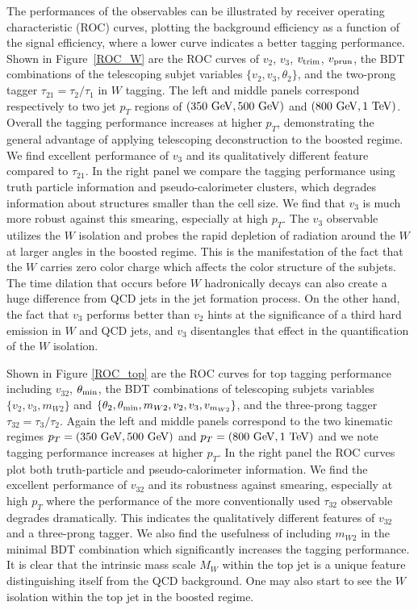 \documentclass[aps,prl,floatfix,preprintnumbers,twocolumn,groupedaddress,nofootinbib]{revtex4-1}
\begin{document}
The performances of the observables can be illustrated by receiver operating characteristic (ROC) curves, plotting the background efficiency as a function of the signal efficiency, where a lower curve indicates a better tagging performance. Shown in Figure~\ref{ROC_W} are the ROC curves of $v_2$, $v_3$, $v_{\rm trim}$, $v_{\rm prun}$, the BDT combinations of the telescoping subjet variables $\{v_2, v_3, \theta_2\}$, and the two-prong tagger $\tau_{21}=\tau_{2}/\tau_{1}$ in $W$ tagging. The left and middle panels correspond respectively to two jet $p_T$ regions of $(350~{\rm GeV}, 500~{\rm GeV})$ and $(800~{\rm GeV}, 1~{\rm TeV})$. Overall the tagging performance increases at higher $p_T$, demonstrating the general advantage of applying telescoping deconstruction to the boosted regime. We find excellent performance of $v_3$ and its qualitatively different feature compared to $\tau_{21}$. In the right panel we compare the tagging performance using truth particle information and pseudo-calorimeter clusters, which degrades information about structures smaller than the cell size. We find that $v_3$ is much more robust against this smearing, especially at high $p_T$. The $v_3$ observable utilizes the $W$ isolation and probes the rapid depletion of radiation around the $W$ at larger angles in the boosted regime. This is the manifestation of the fact that the $W$ carries zero color charge which affects the color structure of the subjets. The time dilation that occurs before $W$ hadronically decays can also create a huge difference from QCD jets in the jet formation process. On the other hand, the fact that $v_3$ performs better than $v_2$ hints at the significance of a third hard emission in $W$ and QCD jets, and $v_3$ disentangles that effect in the quantification of the $W$ isolation.

Shown in Figure \ref{ROC_top} are the ROC curves for top tagging performance including $v_{32}$, $\theta_{\rm min}$, the BDT combinations of telescoping subjets variables $\{v_2, v_3, m_{W2}\}$ and $\{\theta_2,\theta_{\rm min},m_{W2},v_2,v_3,v_{m_{W2}}\}$, and the three-prong tagger $\tau_{32}=\tau_{3}/\tau_{2}$. Again the left and middle panels correspond to the two kinematic regimes $p_T=(350~{\rm GeV}, 500~{\rm GeV})$ and $p_T=(800~{\rm GeV}, 1~{\rm TeV})$ and we note tagging performance increases at higher $p_T$. In the right panel the ROC curves plot both truth-particle and pseudo-calorimeter information. We find the excellent performance of $v_{32}$ and its robustness against smearing, especially at high $p_T$ where the performance of the more conventionally used $\tau_{32}$ observable degrades dramatically. This indicates the qualitatively different features of $v_{32}$ and a three-prong tagger. We also find the usefulness of including $m_{W2}$ in the minimal BDT combination which significantly increases the tagging performance. It is clear that the intrinsic mass scale $M_W$ within the top jet is a unique feature distinguishing itself from the QCD background. One may also start to see the $W$ isolation within the top jet in the boosted regime.
\end{document}
